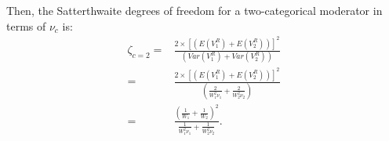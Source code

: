 Then, the Satterthwaite degrees of freedom for a two-categorical moderator in terms of $\nu_c$ is:
\begin{equation} \label{eq: two_catdf in nu_c df terms}
    \begin{split}
    \zeta_{c=2} =& \frac{2 \times \left[ \left(E(V^R_1) + E(V^R_2)  \right) \right]^2}{\left(Var(V^R_1) + Var(V^R_2)  \right)} \\
     =& \frac{2 \times \left[ \left(E(V^R_1) + E(V^R_2)  \right) \right]^2}{\left(\frac{2}{W^2_1\nu_1} + \frac{2}{W^2_2\nu_2} \right)} \\
     =&
\frac{\left( \frac{1}{W_1} + \frac{1}{W_2} \right)^2}
{\frac{1}{W_1^2 \nu_1} + \frac{1}{W_2^2 \nu_2}}.
    \end{split}
    \nonumber
\end{equation}

